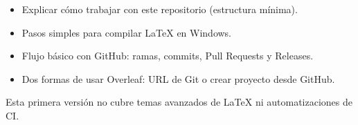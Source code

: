 \begin{itemize}
  \item Explicar cómo trabajar con este repositorio (estructura mínima).
  \item Pasos simples para compilar \LaTeX{} en Windows.
  \item Flujo básico con GitHub: ramas, commits, Pull Requests y Releases.
  \item Dos formas de usar Overleaf: URL de Git o crear proyecto desde GitHub.
\end{itemize}

Esta primera versión no cubre temas avanzados de \LaTeX{} ni automatizaciones de CI.
